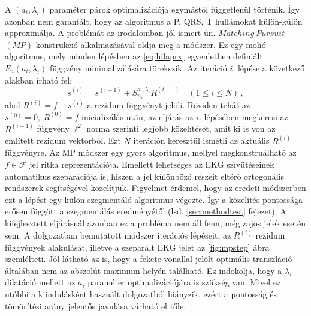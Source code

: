 \documentclass[oneside,titlepage,12pt,a4paper]{report}
\begin{document}
A $(a_i,\lambda_i)$ paraméter párok optimalizációja egymástól függetlenül történik. Így azonban nem garantált, hogy az algoritmus a P, QRS, T hullámokat külön-külön approximálja. A problémát az irodalomban jól ismert ún. $Matching\ Pursuit$ $(MP)$ konstrukció \cite{mpCikk} alkalmazásával oldja meg a módszer. Ez egy mohó algoritmus, mely minden lépésben az \eqref{eq:hilaprx} egyenletben definiált $F_n(a_i,\lambda_i)$ függvény minimalizálására törekszik. Az iteráció $i.$ lépése a következő alakban írható fel:
\begin{equation}
	s^{(i)}=s^{(i-1)} + S^{a_i,\lambda_i}_{n_i} R^{(i-1)} \quad (1\leq i \leq N)\,,
\label{eq:mpurs}
\end{equation}
ahol $R^{(i)}=f-s^{(i)}$ a rezidum függvényt jelöli. Röviden tehát az $s^{(0)}=0,\ R^{(0)}=f$ inicializálás után, az eljárás az $i.$ lépésében megkeresi az $R^{(i-1)}$ függvény $\ell^2$ norma szerinti legjobb közelítését, amit ki is von az említett rezidum vektorból. Ezt $N$ iteráción keresztül ismétli az aktuális $R^{(i)}$ függvényre. Az MP módszer egy gyors algoritmus, mellyel megkonstruálható az $f\in\mathcal{F}$ jel ritka reprezentációja. Emellett lehetséges az EKG szívütéseinek automatikus szeparációja is, hiszen a jel különböző részeit eltérő ortogonális rendszerek segítségével közelítjük. Figyelmet érdemel, hogy az eredeti \cite{origCikk} módszerben ezt a lépést egy külön szegmentáló algoritmus végezte. Így a közelítés pontossága erősen függött a szegmentálás eredményétől (lsd. \ref{sec:methodtest} fejezet). A kifejlesztett eljárásnál azonban ez a probléma nem áll fenn, még zajos jelek esetén sem. A dolgozatban bemutatott módszer iterációs lépéseit, az $R^{(i)}$ rezidum függvények alakulását, illetve a szeparált EKG jelet az \ref{fig:mpstep} ábra szemlélteti. Jól látható az is, hogy a fekete vonallal jelölt optimális transzláció általában nem az abszolút maximum helyén található. Ez indokolja, hogy a $\lambda_i$ dilatáció mellett az $a_i$ paraméter optimalizációjára is szükség van. Mivel ez utóbbi a kiindulásként használt \cite{origCikk} dolgozatból hiányzik, ezért a pontosság és tömörítési arány jelentős javulása várható el tőle.
\end{document}
